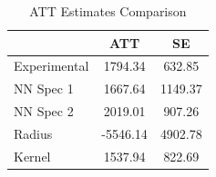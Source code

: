 \begin{table}[htbp]\centering
\caption{ATT Estimates Comparison}
\begin{tabular}{l*{2}{c}}
\hline\hline
            &         ATT&          SE\\
\hline
Experimental&     1794.34&      632.85\\
NN Spec 1   &     1667.64&     1149.37\\
NN Spec 2   &     2019.01&      907.26\\
Radius      &    -5546.14&     4902.78\\
Kernel      &     1537.94&      822.69\\
\hline\hline
\end{tabular}
\end{table}
